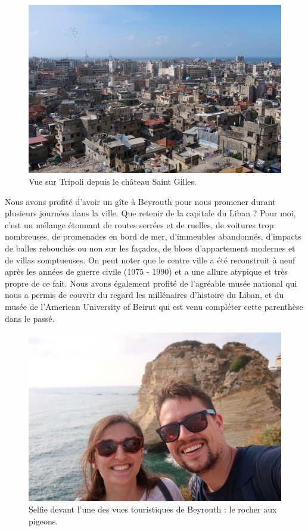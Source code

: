 \begin{figure}
\centering
\includegraphics{images/20180521_tripoli.JPG}
\caption{Vue sur Tripoli depuis le château Saint Gilles.}
\end{figure}

Nous avons profité d'avoir un gîte à Beyrouth pour nous promener durant
plusieurs journées dans la ville. Que retenir de la capitale du Liban ?
Pour moi, c'est un mélange étonnant de routes serrées et de ruelles, de
voitures trop nombreuses, de promenades en bord de mer, d'immeubles
abandonnés, d'impacts de balles rebouchés ou non sur les façades, de
blocs d'appartement modernes et de villas somptueuses. On peut noter que
le centre ville a été reconstruit à neuf après les années de guerre
civile (1975 - 1990) et a une allure atypique et très propre de ce fait.
Nous avons également profité de l'agréable musée national qui nous a
permis de couvrir du regard les millénaires d'histoire du Liban, et du
musée de l'American University of Beirut qui est venu compléter cette
parenthèse dans le passé.

\begin{figure}
\centering
\includegraphics{images/20180521_Rausche.JPG}
\caption{Selfie devant l'une des vues touristiques de Beyrouth : le
rocher aux pigeons.}
\end{figure}

